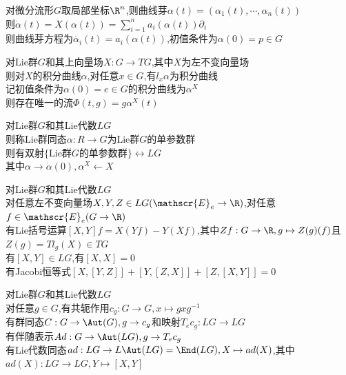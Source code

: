 \begin{zhu}
对微分流形$G$取局部坐标$\R^n$,则曲线芽$\alpha(t)=(\alpha_1(t),\cdots,\alpha_n(t))$\\
则$\dot{\alpha}(t)=X(\alpha(t))=\sum\limits_{i=1}^{n}a_i(\alpha(t))\partial_i$\\
则曲线芽方程为$\dot{\alpha_i}(t)=a_i(\alpha(t))$,初值条件为$\alpha(0)=p\in G$
\end{zhu}

\begin{dingli}
对Lie群$G$和其上向量场$X:G\to TG$,其中$X$为左不变向量场\\
则对$X$的积分曲线$\alpha$,对任意$x\in G$,有$l_{x}\alpha$为积分曲线\\
记初值条件为$\alpha(0)=e\in G$的积分曲线为$\alpha^{X}$\\
则存在唯一的流$\Phi(t,g)=g\alpha^{X}(t)$
\end{dingli}

\begin{dingyi}
对Lie群$G$和其Lie代数$LG$\\
则称Lie群同态$\alpha:R\to G$为Lie群$G$的单参数群\\
则有双射$\{\text{Lie群}G\text{的单参数群}\}\longleftrightarrow LG$\\
其中$\alpha\rightarrow\dot{\alpha}(0),\alpha^{X}\leftarrow X$
\end{dingyi}

\begin{dingli}
对Lie群$G$和其Lie代数$LG$\\
对任意左不变向量场$X,Y,Z\in LG(\mathscr{E}_{e}\to \R)$,对任意$f\in \mathscr{E}_{e}(G\to \R)$\\
有Lie括号运算$[X,Y]f=X(Yf)-Y(Xf)$,其中$Zf:G\to\R,g\mapsto Z(g)(f)$且$Z(g)=Tl_{g}(X)\in TG$\\
有$[X,Y]\in LG$,有$[X,X]=0$\\
有Jacobi恒等式$[X,[Y,Z]]+[Y,[Z,X]]+[Z,[X,Y]]=0$
\end{dingli}

\begin{dingyi}
对Lie群$G$和其Lie代数$LG$\\
对任意$g\in G$,有共轭作用$c_{g}:G\to G,x\mapsto gxg^{-1}$\\
有群同态$C:G\to \Aut(G),g\to c_{g}$和映射$T_{e}c_{g}:LG\to LG$\\
有伴随表示$Ad:G\to \Aut(LG),g\to T_{e}c_{g}$\\
有Lie代数同态$ad:LG\to L\Aut(LG)=\End(LG),X\mapsto ad(X)$,其中$ad(X):LG\to LG,Y\mapsto [X,Y]$
\end{dingyi}

